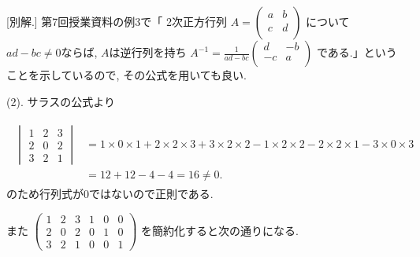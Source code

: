\documentclass[dvipdfmx,a4paper,11pt]{article}
\theoremstyle{definition}
\begin{document}
 [別解.] 第7回授業資料の例3で「
2次正方行列
 $A=
  \begin{pmatrix}
 a& b  \\
 c& d  \\
 \end{pmatrix} 
 $
 について
  $ad-bc \neq 0$ならば, $A$は逆行列を持ち
 $
 A^{-1} =   
 \frac{1}{ad-bc}
 \begin{pmatrix}
 d& -b  \\
 -c& a  \\
 \end{pmatrix} 
 $
 である.」ということを示しているので, その公式を用いても良い.
 

(2). サラスの公式より

\begin{align*}
\begin{split}
\begin{vmatrix}
1 &2&3 \\
2 & 0 & 2 \\
3&2 &1 
 \end{vmatrix}
& =
 1 \times 0 \times 1 + 2 \times 2 \times 3 + 3 \times 2 \times 2 
 - 1 \times 2 \times 2 - 2 \times 2 \times 1 - 3 \times 0 \times 3 \\
 & = 12 + 12 - 4 -4 =16 \neq 0.
\end{split}
\end{align*}
 のため行列式が0ではないので正則である. 
 
 また
 $
  \begin{pmatrix}
1 &2&3 &1 & 0 & 0\\
2 & 0 & 2 &0 & 1 & 0\\
3&2 &1 &0 & 0 & 1
 \end{pmatrix}
 $
を簡約化すると次の通りになる.
 
\end{document}
